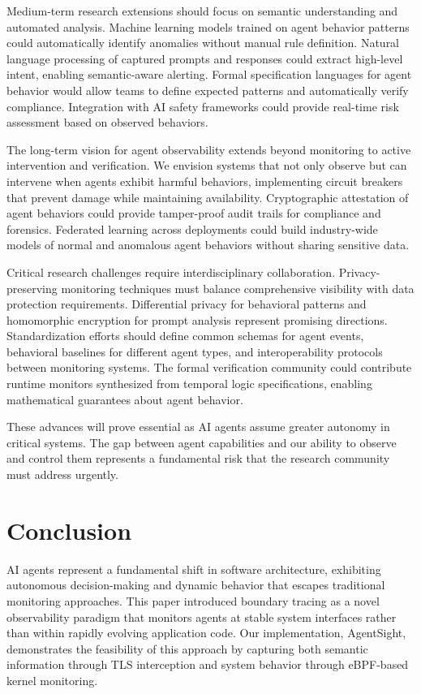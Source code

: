Medium-term research extensions should focus on semantic understanding and automated analysis. Machine learning models trained on agent behavior patterns could automatically identify anomalies without manual rule definition. Natural language processing of captured prompts and responses could extract high-level intent, enabling semantic-aware alerting. Formal specification languages for agent behavior would allow teams to define expected patterns and automatically verify compliance. Integration with AI safety frameworks could provide real-time risk assessment based on observed behaviors.

The long-term vision for agent observability extends beyond monitoring to active intervention and verification. We envision systems that not only observe but can intervene when agents exhibit harmful behaviors, implementing circuit breakers that prevent damage while maintaining availability. Cryptographic attestation of agent behaviors could provide tamper-proof audit trails for compliance and forensics. Federated learning across deployments could build industry-wide models of normal and anomalous agent behaviors without sharing sensitive data.

Critical research challenges require interdisciplinary collaboration. Privacy-preserving monitoring techniques must balance comprehensive visibility with data protection requirements. Differential privacy for behavioral patterns and homomorphic encryption for prompt analysis represent promising directions. Standardization efforts should define common schemas for agent events, behavioral baselines for different agent types, and interoperability protocols between monitoring systems. The formal verification community could contribute runtime monitors synthesized from temporal logic specifications, enabling mathematical guarantees about agent behavior.

These advances will prove essential as AI agents assume greater autonomy in critical systems. The gap between agent capabilities and our ability to observe and control them represents a fundamental risk that the research community must address urgently.


\section{Conclusion}

AI agents represent a fundamental shift in software architecture, exhibiting autonomous decision-making and dynamic behavior that escapes traditional monitoring approaches. This paper introduced boundary tracing as a novel observability paradigm that monitors agents at stable system interfaces rather than within rapidly evolving application code. Our implementation, AgentSight, demonstrates the feasibility of this approach by capturing both semantic information through TLS interception and system behavior through eBPF-based kernel monitoring.

